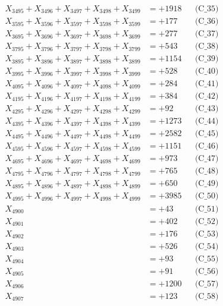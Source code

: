 \documentclass[a4paper,10pt]{article}
\begin{document}
{\begin{align}
X_{3495} + X_{3496} + X_{3497} + X_{3498} + X_{3499} &= +1918 && \text{(C\_35)} \\
\allowbreak
X_{3595} + X_{3596} + X_{3597} + X_{3598} + X_{3599} &= +177 && \text{(C\_36)} \\
X_{3695} + X_{3696} + X_{3697} + X_{3698} + X_{3699} &= +277 && \text{(C\_37)} \\
X_{3795} + X_{3796} + X_{3797} + X_{3798} + X_{3799} &= +543 && \text{(C\_38)} \\
X_{3895} + X_{3896} + X_{3897} + X_{3898} + X_{3899} &= +1154 && \text{(C\_39)} \\
X_{3995} + X_{3996} + X_{3997} + X_{3998} + X_{3999} &= +528 && \text{(C\_40)} \\
\allowbreak
X_{4095} + X_{4096} + X_{4097} + X_{4098} + X_{4099} &= +284 && \text{(C\_41)} \\
X_{4195} + X_{4196} + X_{4197} + X_{4198} + X_{4199} &= +384 && \text{(C\_42)} \\
X_{4295} + X_{4296} + X_{4297} + X_{4298} + X_{4299} &= +92 && \text{(C\_43)} \\
X_{4395} + X_{4396} + X_{4397} + X_{4398} + X_{4399} &= +1273 && \text{(C\_44)} \\
X_{4495} + X_{4496} + X_{4497} + X_{4498} + X_{4499} &= +2582 && \text{(C\_45)} \\
\allowbreak
X_{4595} + X_{4596} + X_{4597} + X_{4598} + X_{4599} &= +1151 && \text{(C\_46)} \\
X_{4695} + X_{4696} + X_{4697} + X_{4698} + X_{4699} &= +973 && \text{(C\_47)} \\
X_{4795} + X_{4796} + X_{4797} + X_{4798} + X_{4799} &= +765 && \text{(C\_48)} \\
X_{4895} + X_{4896} + X_{4897} + X_{4898} + X_{4899} &= +650 && \text{(C\_49)} \\
X_{4995} + X_{4996} + X_{4997} + X_{4998} + X_{4999} &= +3985 && \text{(C\_50)} \\
\allowbreak
X_{4900} &= +43 && \text{(C\_51)} \\
X_{4901} &= +402 && \text{(C\_52)} \\
X_{4902} &= +176 && \text{(C\_53)} \\
X_{4903} &= +526 && \text{(C\_54)} \\
X_{4904} &= +93 && \text{(C\_55)} \\
\allowbreak
X_{4905} &= +91 && \text{(C\_56)} \\
X_{4906} &= +1200 && \text{(C\_57)} \\
X_{4907} &= +123 && \text{(C\_58)} \\

\end{align}}
\end{document}
